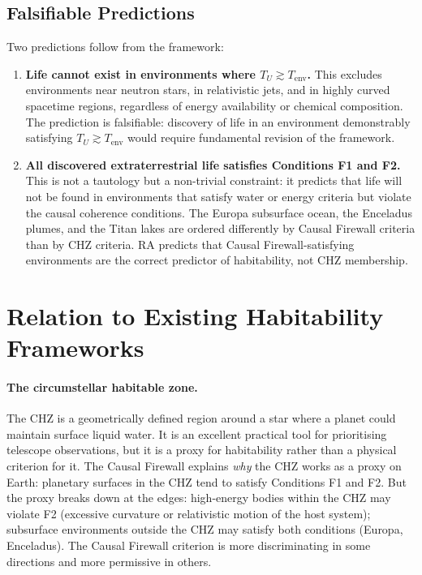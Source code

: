 \documentclass[11pt,a4paper]{article}
\theoremstyle{plain}
\theoremstyle{definition}
\theoremstyle{remark}
\begin{document}
\subsection{Falsifiable Predictions}

Two predictions follow from the framework:

\begin{enumerate}
  \item \textbf{Life cannot exist in environments where $T_U \gtrsim
  T_{\mathrm{env}}$.} This excludes environments near neutron stars, in
  relativistic jets, and in highly curved spacetime regions, regardless
  of energy availability or chemical composition. The prediction is
  falsifiable: discovery of life in an environment demonstrably satisfying
  $T_U \gtrsim T_{\mathrm{env}}$ would require fundamental revision of
  the framework.

  \item \textbf{All discovered extraterrestrial life satisfies Conditions
  F1 and F2.} This is not a tautology but a non-trivial constraint: it
  predicts that life will not be found in environments that satisfy water
  or energy criteria but violate the causal coherence conditions. The
  Europa subsurface ocean, the Enceladus plumes, and the Titan lakes are
  ordered differently by Causal Firewall criteria than by CHZ criteria.
  RA predicts that Causal Firewall-satisfying environments are the correct
  predictor of habitability, not CHZ membership.
\end{enumerate}

\section{Relation to Existing Habitability Frameworks}
\label{sec:comparison}

\paragraph{The circumstellar habitable zone.}
The CHZ \citep{Kasting1993, Kopparapu2013} is a geometrically defined
region around a star where a planet could maintain surface liquid water.
It is an excellent practical tool for prioritising telescope observations,
but it is a proxy for habitability rather than a physical criterion for
it. The Causal Firewall explains \emph{why} the CHZ works as a proxy on
Earth: planetary surfaces in the CHZ tend to satisfy Conditions F1 and F2.
But the proxy breaks down at the edges: high-energy bodies within the CHZ
may violate F2 (excessive curvature or relativistic motion of the host
system); subsurface environments outside the CHZ may satisfy both conditions
(Europa, Enceladus). The Causal Firewall criterion is more discriminating
in some directions and more permissive in others.
\end{document}
